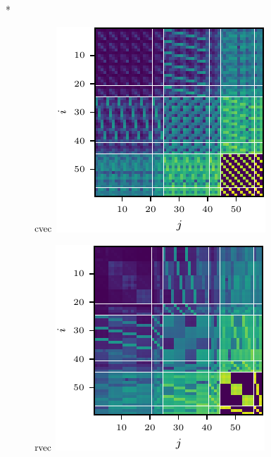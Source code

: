 \switchcolumn[1]*
\begin{figure}[!h]
  \centering
  \begin{minipage}[t]{0.495\linewidth}
    \centering
    $\operatorname{cvec}$\vspace{1ex}
    \includegraphics[width=\linewidth]{../kfs/plots/synthetic_cvec_hessian.pdf}
  \end{minipage}
  \hfill
  \begin{minipage}[t]{0.495\linewidth}
    \centering
    $\operatorname{rvec}$\vspace{1ex}
    \includegraphics[width=\linewidth]{../kfs/plots/synthetic_rvec_hessian.pdf}

\end{minipage}
\end{figure}
